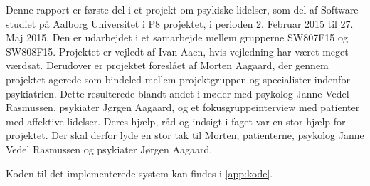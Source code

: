 Denne rapport er første del i et projekt om psykiske lidelser, som del af Software studiet på Aalborg Universitet i P8 projektet, i perioden 2. Februar 2015 til 27. Maj 2015. 
Den er udarbejdet i et samarbejde mellem grupperne SW807F15 og SW808F15.
Projektet er vejledt af Ivan Aaen, hvis vejledning har været meget værdsat.
Derudover er projektet foreslået af Morten Aagaard, der gennem projektet agerede som bindeled mellem projektgruppen og specialister indenfor psykiatrien.
Dette resulterede blandt andet i møder med psykolog Janne Vedel Rasmussen, psykiater Jørgen Aagaard, og et fokusgruppeinterview med patienter med affektive lidelser.
Deres hjælp, råd og indsigt i faget var en stor hjælp for projektet.
Der skal derfor lyde en stor tak til Morten, patienterne, psykolog Janne Vedel Rasmussen og psykiater Jørgen Aagaard.

Koden til det implementerede system kan findes i \cref{app:kode}.